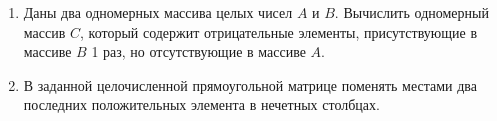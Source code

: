 \begin{enumerate}
    \item Даны два одномерных массива целых чисел \(A\) и \(B\). Вычислить одномерный массив \(C\), который содержит отрицательные элементы, присутствующие в массиве \(B\) 1 раз, но отсутствующие в массиве \(A\). 
    \item В заданной целочисленной прямоугольной матрице поменять местами два последних положительных элемента в нечетных столбцах.
\end{enumerate}
